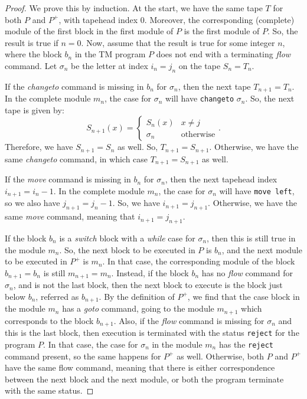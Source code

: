 \documentclass{article}
\theoremstyle{definition}
\begin{document}
    \begin{proof}
        We prove this by induction. At the start, we have the same tape $T$ for both $P$ and $P^+$, with tapehead index 0. Moreover, the corresponding (complete) module of the first block in the first module of $P$ is the first module of $P$. So, the result is true if $n = 0$. Now, assume that the result is true for some integer $n$, where the block $b_n$ in the TM program $P$ does not end with a terminating \textit{flow} command. Let $\sigma_n$ be the letter at index $i_n = j_n$ on the tape $S_n = T_n$.
        
        If the \textit{changeto} command is missing in $b_n$ for $\sigma_n$, then the next tape $T_{n+1} = T_n$. In the complete module $m_n$, the case for $\sigma_n$ will have \texttt{changeto} $\sigma_n$. So, the next tape is given by:
        \[S_{n+1}(x) = \begin{cases}
            S_n(x) & x \neq j \\
            \sigma_n & \text{otherwise}
        \end{cases}.\]
        Therefore, we have $S_{n+1} = S_n$ as well. So, $T_{n+1} = S_{n+1}$. Otherwise, we have the same \textit{changeto} command, in which case $T_{n+1} = S_{n+1}$ as well.

        If the \textit{move} command is missing in $b_n$ for $\sigma_n$, then the next tapehead index $i_{n+1} = i_n - 1$. In the complete module $m_n$, the case for $\sigma_n$ will have \texttt{move left}, so we also have $j_{n+1} = j_n - 1$. So, we have $i_{n+1} = j_{n+1}$. Otherwise, we have the same \textit{move} command, meaning that $i_{n+1} = j_{n+1}$.

        If the block $b_n$ is a \textit{switch} block with a \textit{while} case for $\sigma_n$, then this is still true in the module $m_n$. So, the next block to be executed in $P$ is $b_n$, and the next module to be executed in $P^+$ is $m_n$. In that case, the corresponding module of the block $b_{n+1} = b_n$ is still $m_{n+1} = m_n$. Instead, if the block $b_n$ has no \textit{flow} command for $\sigma_n$, and is not the last block, then the next block to execute is the block just below $b_n$, referred as $b_{n+1}$. By the definition of $P^+$, we find that the case block in the module $m_n$ has a \textit{goto} command, going to the module $m_{n+1}$ which corresponds to the block $b_{n+1}$. Also, if the \textit{flow} command is missing for $\sigma_n$ and this is the last block, then execution is terminated with the status \texttt{reject} for the program $P$. In that case, the case for $\sigma_n$ in the module $m_n$ has the \texttt{reject} command present, so the same happens for $P^+$ as well. Otherwise, both $P$ and $P^+$ have the same flow command, meaning that there is either correspondence between the next block and the next module, or both the program terminate with the same status.
    \end{proof}
\end{document}
